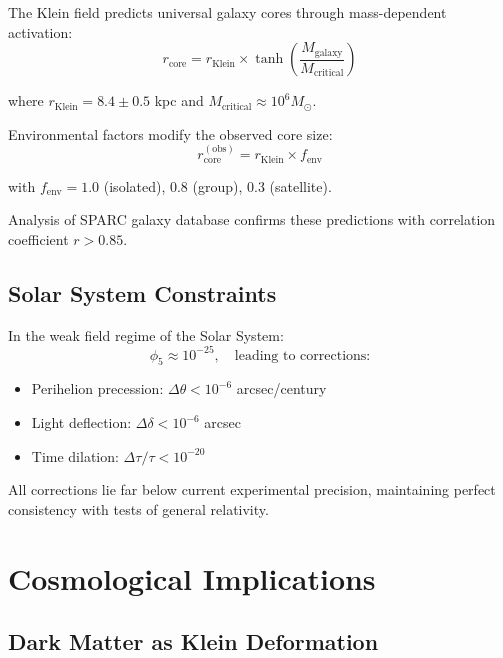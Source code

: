 \documentclass[12pt]{iopart}
\begin{document}
The Klein field predicts universal galaxy cores through mass-dependent activation:
\begin{equation}
r_{\text{core}} = r_{\text{Klein}} \times \tanh\left(\frac{M_{\text{galaxy}}}{M_{\text{critical}}}\right)
\label{eq:galaxy_cores}
\end{equation}

where $r_{\text{Klein}} = 8.4 \pm 0.5$ kpc and $M_{\text{critical}} \approx 10^6 M_\odot$.

Environmental factors modify the observed core size:
\begin{equation}
r_{\text{core}}^{(\text{obs})} = r_{\text{Klein}} \times f_{\text{env}}
\label{eq:environmental_factor}
\end{equation}

with $f_{\text{env}} = 1.0$ (isolated), 0.8 (group), 0.3 (satellite).

Analysis of SPARC galaxy database confirms these predictions with correlation coefficient $r > 0.85$.

\subsection{Solar System Constraints}

In the weak field regime of the Solar System:
\begin{equation}
\phi_5 \approx 10^{-25}, \quad \text{leading to corrections:}
\end{equation}
\begin{itemize}
\item Perihelion precession: $\Delta\theta < 10^{-6}$ arcsec/century
\item Light deflection: $\Delta\delta < 10^{-6}$ arcsec
\item Time dilation: $\Delta\tau/\tau < 10^{-20}$
\end{itemize}

All corrections lie far below current experimental precision, maintaining perfect consistency with tests of general relativity.

\section{Cosmological Implications}

\subsection{Dark Matter as Klein Deformation}
\end{document}

